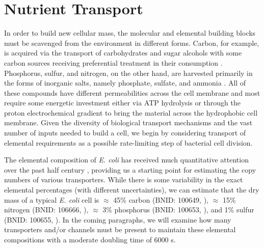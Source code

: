 \section{Nutrient Transport}
In order to build new cellular mass, the molecular and elemental building
blocks must be scavenged from the environment in different forms. Carbon, for
example, is acquired via the transport of carbohydrates and sugar alcohols
with some carbon sources receiving preferential treatment in their
consumption \citep{monod1947}. Phosphorus, sulfur, and nitrogen, on the other
hand, are harvested primarily in the forms of inorganic salts, namely
phosphate, sulfate, and ammonia \citep{jun2018, assentoft2016, stasi2019,
antonenko1997, rosenberg1977, willsky1973}. All of these compounds have
different permeabilities across the cell membrane and most require some
energetic investment either via ATP hydrolysis or through the proton
electrochemical gradient to bring the material across the hydrophobic cell
membrane. Given the diversity of biological transport mechanisms and the vast
number of inputs needed to build a cell, we begin by considering transport of
elemental requirements as a possible rate-limiting step of bacterial cell
division.


The elemental composition of \textit{E. coli} has received much quantitative
attention over the past half century \citep{neidhardt1991,
taymaz-nikerel2010, heldal1985, bauer1976}, providing us a starting point for
estimating the copy numbers of various transporters. While there is some
variability in the exact elemental percentages (with different
uncertainties), we can estimate that the dry mass of a typical \textit{E.
coli} cell is $\approx$ 45\% carbon (BNID: 100649, \cite{milo2010}),
$\approx$ 15\% nitrogen (BNID: 106666, \cite{milo2010}), $\approx$ 3\%
phosphorus (BNID: 100653, \cite{milo2010}), and 1\% sulfur (BNID: 100655,
\cite{milo2010}). In the coming paragraphs, we will examine how many
transporters and/or channels must be present to maintain these elemental
compositions with a moderate doubling time of 6000 s.


